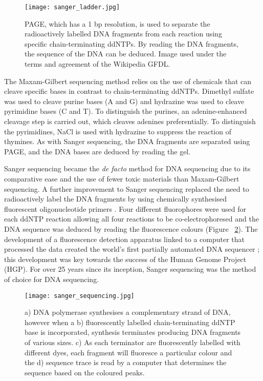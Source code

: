 \begin{figure}[!ht]
   \centering
   \texttt{[image: sanger\_ladder.jpg]}
   \caption[Radioactively labelled sequencing gel]{PAGE, which has a 1 bp resolution, is used to separate the radioactively labelled DNA fragments from each reaction using specific chain-terminating ddNTPs. By reading the DNA fragments, the sequence of the DNA can be deduced. Image used under the terms and agreement of the Wikipedia GFDL.}
   \label{fig:sanger_ladder}
\end{figure}

The Maxam-Gilbert sequencing method \citep{pmid265521} relies on the use of chemicals that can cleave specific bases in contrast to chain-terminating ddNTPs. Dimethyl sulfate was used to cleave purine bases (A and G) and hydrazine was used to cleave pyrimidine bases (C and T). To distinguish the purines, an adenine-enhanced cleavage step is carried out, which cleaves adenines preferentially. To distinguish the pyrimidines, NaCl is used with hydrazine to suppress the reaction of thymines. As with Sanger sequencing, the DNA fragments are separated using PAGE, and the DNA bases are deduced by reading the gel.

Sanger sequencing became the \textit{de facto} method for DNA sequencing due to its comparative ease and the use of fewer toxic materials than Maxam-Gilbert sequencing. A further improvement to Sanger sequencing replaced the need to radioactively label the DNA fragments by using chemically synthesised fluorescent oligonucleotide primers \citep{pmid3713851}. Four different fluorophores were used for each ddNTP reaction allowing all four reactions to be co-electrophoresed and the DNA sequence was deduced by reading the fluorescence colours (Figure ~\ref{fig:sanger_sequencing}). The development of a fluorescence detection apparatus linked to a computer that processed the data created the world's first partially automated DNA sequencer \citep{pmid3713851}; this development was key towards the success of the Human Genome Project (HGP). For over 25 years since its inception, Sanger sequencing was the method of choice for DNA sequencing.

\begin{figure}[!ht]
   \centering
   \texttt{[image: sanger\_sequencing.jpg]}
   \caption[Sanger sequencing]{a) DNA polymerase synthesises a complementary strand of DNA, however when a b) fluorescently labelled chain-terminating ddNTP base is incorporated, synthesis terminates producing DNA fragments of various sizes. c) As each terminator are fluorescently labelled with different dyes, each fragment will fluoresce a particular colour and the d) sequence trace is read by a computer that determines the sequence based on the coloured peaks.}
   \label{fig:sanger_sequencing}
\end{figure}


